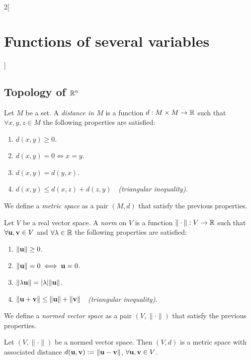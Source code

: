 \documentclass[../../../main.tex]{subfiles}
\begin{document}
\begin{multicols}{2}[\section{Functions of several variables}]
  \subsection{Topology of \texorpdfstring{$\mathbb{R}^n$}{Rn}}
  \begin{definition}
    Let $M$ be a set. A \textit{distance in $M$} is a function $d:M\times M\rightarrow\mathbb{R} $ such that $\forall x,y,z\in M$ the following properties are satisfied:
    \begin{enumerate}
      \item $d(x,y)\geq 0$.
      \item $d(x,y)=0\iff x=y$.
      \item $d(x,y)=d(y,x)$.
      \item $d(x,y)\leq d(x,z)+d(z,y)\quad$\textit{(triangular inequality)}.
    \end{enumerate}
    We define a \textit{metric space} as a pair $(M,d)$ that satisfy the previous properties.
    \label{FOSV_metric}
  \end{definition}
  \begin{definition}\label{FOSV_norm}
    Let $V$ be a real vector space. A \textit{norm} on $V$ is a function $\|\cdot\|:V\rightarrow\mathbb{R} $ such that $\forall \vb{u},\vb{v}\in V$ and $\forall\lambda\in\mathbb{R} $ the following properties are satisfied:
    \begin{enumerate}
      \item $\|\vb{u}\|\geq 0$.
      \item $\|\vb{u}\|=0\iff \vb{u}=0$.
      \item $\|\lambda \vb{u}\|=|\lambda|\|\vb{u}\|$.
      \item $\|\vb{u}+\vb{v}\|\leq \|\vb{u}\|+\|\vb{v}\|\quad$\textit{(triangular inequality)}.
    \end{enumerate}
    We define a \textit{normed vector space} as a pair $(V,\|\cdot\|)$ that satisfy the previous properties.
  \end{definition}
  \begin{prop}
    Let $(V,\|\cdot\|)$ be a normed vector space. Then $(V,d)$ is a metric space with associated distance $d(\vb{u},\vb{v}):=\|\vb{u}-\vb{v}\|$, $\forall \vb{u},\vb{v}\in V$.

\end{prop}
\end{multicols}
\end{document}
